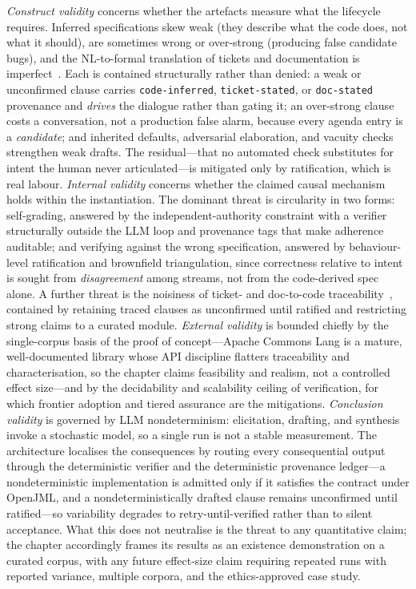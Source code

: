 \emph{Construct validity} concerns whether the artefacts measure what the lifecycle requires. Inferred specifications skew weak (they describe what the code does, not what it should), are sometimes wrong or over-strong (producing false candidate bugs), and the NL-to-formal translation of tickets and documentation is imperfect~\cite{ernst2007daikon,cosler2023nl2spec,endres2024nl2postcond,ma2025specgen}. Each is contained structurally rather than denied: a weak or unconfirmed clause carries \texttt{code-inferred}, \texttt{ticket-stated}, or \texttt{doc-stated} provenance and \emph{drives} the dialogue rather than gating it; an over-strong clause costs a conversation, not a production false alarm, because every agenda entry is a \emph{candidate}; and inherited defaults, adversarial elaboration, and vacuity checks strengthen weak drafts. The residual---that no automated check substitutes for intent the human never articulated---is mitigated only by ratification, which is real labour. \emph{Internal validity} concerns whether the claimed causal mechanism holds within the instantiation. The dominant threat is circularity in two forms: self-grading, answered by the independent-authority constraint with a verifier structurally outside the LLM loop and provenance tags that make adherence auditable; and verifying against the wrong specification, answered by behaviour-level ratification and brownfield triangulation, since correctness relative to intent is sought from \emph{disagreement} among streams, not from the code-derived spec alone. A further threat is the noisiness of ticket- and doc-to-code traceability~\cite{antoniol2002recovering,borg2014recovering,lin2021tbert,tan2012tcomment,wen2019codecomment}, contained by retaining traced clauses as unconfirmed until ratified and restricting strong claims to a curated module. \emph{External validity} is bounded chiefly by the single-corpus basis of the proof of concept---Apache Commons Lang is a mature, well-documented library whose API discipline flatters traceability and characterisation, so the chapter claims feasibility and realism, not a controlled effect size---and by the decidability and scalability ceiling of verification, for which frontier adoption and tiered assurance are the mitigations. \emph{Conclusion validity} is governed by LLM nondeterminism: elicitation, drafting, and synthesis invoke a stochastic model, so a single run is not a stable measurement. The architecture localises the consequences by routing every consequential output through the deterministic verifier and the deterministic provenance ledger---a nondeterministic implementation is admitted only if it satisfies the contract under OpenJML, and a nondeterministically drafted clause remains unconfirmed until ratified---so variability degrades to retry-until-verified rather than to silent acceptance. What this does not neutralise is the threat to any quantitative claim; the chapter accordingly frames its results as an existence demonstration on a curated corpus, with any future effect-size claim requiring repeated runs with reported variance, multiple corpora, and the ethics-approved case study.

